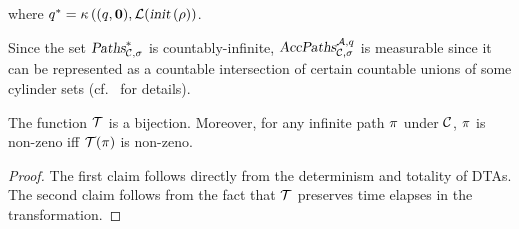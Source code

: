 where
$
    q^*
        =
            \kappa \left(
                (q,\mathbf{0}),
                \mathcal{L} (
                    \mbox{\sl init}\left(\rho\right)
            \right)
$.

Since the set $\mbox{\sl Paths}^*_{\mathcal{C},\sigma}$ is countably-infinite,
$\mbox{\sl AccPaths} _{\mathcal{C},\sigma} ^{\mathcal{A},q}$ is measurable since it can be represented as a countable intersection of certain countable unions of some cylinder sets (cf.~\cite[Remark 10.24]{DBLP:books/daglib/0020348} for details).

\smallskip
{}
The function $\mathcal{T}$ is a bijection. Moreover, for any infinite path $\pi$ under $\mathcal{C}$, $\pi$ is non-zeno iff $\mathcal{T}(\pi)$ is non-zeno.
\begin{proof}
The first claim follows directly from the determinism and totality of DTAs.
The second claim follows from the fact that $\mathcal{T}$ preserves time elapses in the transformation.
\end{proof}

